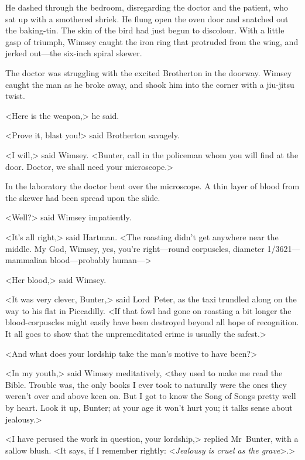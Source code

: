 He dashed through the bedroom, disregarding the doctor and the patient, who sat up with a smothered shriek. He flung open the oven door and snatched out the baking-tin. The skin of the bird had just begun to discolour. With a little gasp of triumph, Wimsey caught the iron ring that protruded from the wing, and jerked out—the six-inch spiral skewer.

The doctor was struggling with the excited Brotherton in the doorway. Wimsey caught the man as he broke away, and shook him into the corner with a jiu-jitsu twist.

<Here is the weapon,> he said.

<Prove it, blast you!> said Brotherton savagely.

<I will,> said Wimsey. <Bunter, call in the policeman whom you will find at the door. Doctor, we shall need your microscope.>

In the laboratory the doctor bent over the microscope. A thin layer of blood from the skewer had been spread upon the slide.

<Well?> said Wimsey impatiently.

<It's all right,> said Hartman. <The roasting didn't get anywhere near the middle. My God, Wimsey, yes, you're right—round corpuscles, diameter 1/3621—mammalian blood—probably human—>

<Her blood,> said Wimsey.

<It was very clever, Bunter,> said Lord~Peter, as the taxi trundled along on the way to his flat in Piccadilly. <If that fowl had gone on roasting a bit longer the blood-corpuscles might easily have been destroyed beyond all hope of recognition. It all goes to show that the unpremeditated crime is usually the safest.>

<And what does your lordship take the man's motive to have been?>

<In my youth,> said Wimsey meditatively, <they used to make me read the Bible. Trouble was, the only books I ever took to naturally were the ones they weren't over and above keen on. But I got to know the Song of Songs pretty well by heart. Look it up, Bunter; at your age it won't hurt you; it talks sense about jealousy.>

<I have perused the work in question, your lordship,> replied Mr~Bunter, with a sallow blush. <It says, if I remember rightly: <\textit{Jealousy is cruel as the grave}>.>